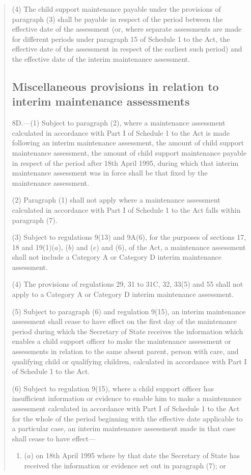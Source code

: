 \documentclass[a4paper]{article}
\begin{document}
\begin{quotation}
(4) The child support maintenance payable under the provisions of paragraph (3) shall be payable in respect of the period between the effective date of the assessment (or, where separate assessments are made for different periods under paragraph 15 of Schedule 1 to the Act, the effective date of the assessment in respect of the earliest such period) and the effective date of the interim maintenance assessment.

\subsection*{Miscellaneous provisions in relation to interim maintenance assessments}

8D.—(1) Subject to paragraph (2), where a maintenance assessment calculated in accordance with Part I of Schedule 1 to the Act is made following an interim maintenance assessment, the amount of child support maintenance assessment, the amount of child support maintenance payable in respect of the period after 18th April 1995, during which that interim maintenance assessment was in force shall be that fixed by the maintenance assessment.

(2) Paragraph (1) shall not apply where a maintenance assessment calculated in accordance with Part I of Schedule 1 to the Act falls within paragraph (7).

(3) Subject to regulations 9(13) and 9A(6), for the purposes of sections 17, 18 and 19(1)($a$), ($b$) and ($e$) and (6), of the Act, a maintenance assessment shall not include a Category A or Category D interim maintenance assessment.

(4) The provisions of regulations 29, 31 to 31C, 32, 33(5) and 55 shall not apply to a Category A or Category D interim maintenance assessment.

(5) Subject to paragraph (6) and regulation 9(15), an interim maintenance assessment shall cease to have effect on the first day of the maintenance period during which the Secretary of State receives the information which enables a child support officer to make the maintenance assessment or assessments in relation to the same absent parent, person with care, and qualifying child or qualifying children, calculated in accordance with Part I of Schedule 1 to the Act.

(6) Subject to regulation 9(15), where a child support officer has insufficient information or evidence to enable him to make a maintenance assessment calculated in accordance with Part I of Schedule 1 to the Act for the whole of the period beginning with the effective date applicable to a particular case, an interim maintenance assessment made in that case shall cease to have effect—
\begin{enumerate}\item[]
($a$) on 18th April 1995 where by that date the Secretary of State has received the information or evidence set out in paragraph (7); or


\end{enumerate}
\end{quotation}
\end{document}
